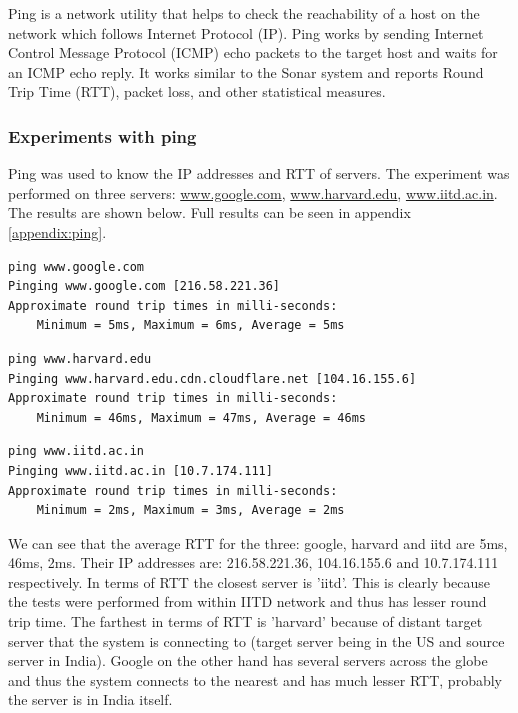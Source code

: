 \documentclass[a4paper, 11pt]{article}
\begin{document}
Ping is a network utility that helps to check the reachability of a host on the network which follows Internet Protocol (IP). Ping works by sending Internet Control Message Protocol (ICMP) echo packets to the target host and waits for an ICMP echo reply. It works similar to the Sonar system and reports Round Trip Time (RTT), packet loss, and other statistical measures.

\subsubsection{Experiments with ping}

Ping was used to know the IP addresses and RTT of servers. The experiment was performed on three servers: \url{www.google.com}, \url{www.harvard.edu}, \url{www.iitd.ac.in}. The results are shown below. Full results can be seen in appendix \ref{appendix:ping}.

\begin{lstlisting}[style=BashInputStyle]
ping www.google.com
Pinging www.google.com [216.58.221.36]
Approximate round trip times in milli-seconds:
    Minimum = 5ms, Maximum = 6ms, Average = 5ms
\end{lstlisting}  

\begin{lstlisting}[style=BashInputStyle]
ping www.harvard.edu
Pinging www.harvard.edu.cdn.cloudflare.net [104.16.155.6]
Approximate round trip times in milli-seconds:
    Minimum = 46ms, Maximum = 47ms, Average = 46ms
\end{lstlisting}  

\begin{lstlisting}[style=BashInputStyle]
ping www.iitd.ac.in
Pinging www.iitd.ac.in [10.7.174.111]
Approximate round trip times in milli-seconds:
    Minimum = 2ms, Maximum = 3ms, Average = 2ms
\end{lstlisting}

We can see that the average RTT for the three: google, harvard and iitd are 5ms, 46ms, 2ms. Their IP addresses are: 216.58.221.36, 104.16.155.6 and 10.7.174.111 respectively. In terms of RTT the closest server is 'iitd'. This is clearly because the tests were performed from within IITD network and thus has lesser round trip time. The farthest in terms of RTT is 'harvard' because of distant target server that the system is connecting to (target server being in the US and source server in India). Google on the other hand has several servers across the globe and thus the system connects to the nearest and has much lesser RTT, probably the server is in India itself.
\end{document}

